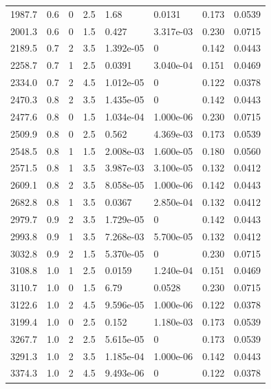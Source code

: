 \documentclass[preview]{standalone}
\begin{document}
{{\begin{tabular}{L{1.2cm}C{1.2cm} C{0.3cm}C{0.5cm} C{1.4cm}C{1.4cm} C{1.4cm}C{1.4cm}}
  1987.7  &   0.6  & 0     & 2.5 &  1.68  & 0.0131  & 0.173 &  0.0539   \\ 
  2001.3  &   0.6  & 0     & 1.5 &  0.427  & 3.317e-03  & 0.230 &  0.0715   \\ 
  2189.5  &   0.7  & 2     & 3.5 &  1.392e-05  & 0  & 0.142 &  0.0443   \\ 
  2258.7  &   0.7  & 1     & 2.5 &  0.0391  & 3.040e-04  & 0.151 &  0.0469   \\ 
  2334.0  &   0.7  & 2     & 4.5 &  1.012e-05  & 0  & 0.122 &  0.0378   \\ 
  2470.3  &   0.8  & 2     & 3.5 &  1.435e-05  & 0  & 0.142 &  0.0443   \\ 
  2477.6  &   0.8  & 0     & 1.5 &  1.034e-04  & 1.000e-06  & 0.230 &  0.0715   \\ 
  2509.9  &   0.8  & 0     & 2.5 &  0.562  & 4.369e-03  & 0.173 &  0.0539   \\ 
  2548.5  &   0.8  & 1     & 1.5 &  2.008e-03  & 1.600e-05  & 0.180 &  0.0560   \\ 
  2571.5  &   0.8  & 1     & 3.5 &  3.987e-03  & 3.100e-05  & 0.132 &  0.0412   \\ 
  2609.1  &   0.8  & 2     & 3.5 &  8.058e-05  & 1.000e-06  & 0.142 &  0.0443   \\ 
  2682.8  &   0.8  & 1     & 3.5 &  0.0367  & 2.850e-04  & 0.132 &  0.0412   \\ 
  2979.7  &   0.9  & 2     & 3.5 &  1.729e-05  & 0  & 0.142 &  0.0443   \\ 
  2993.8  &   0.9  & 1     & 3.5 &  7.268e-03  & 5.700e-05  & 0.132 &  0.0412   \\ 
  3032.8  &   0.9  & 2     & 1.5 &  5.370e-05  & 0  & 0.230 &  0.0715   \\ 
  3108.8  &   1.0  & 1     & 2.5 &  0.0159  & 1.240e-04  & 0.151 &  0.0469   \\ 
  3110.7  &   1.0  & 0     & 1.5 &  6.79  & 0.0528  & 0.230 &  0.0715   \\ 
  3122.6  &   1.0  & 2     & 4.5 &  9.596e-05  & 1.000e-06  & 0.122 &  0.0378   \\ 
  3199.4  &   1.0  & 0     & 2.5 &  0.152  & 1.180e-03  & 0.173 &  0.0539   \\ 
  3267.7  &   1.0  & 2     & 2.5 &  5.615e-05  & 0  & 0.173 &  0.0539   \\ 
  3291.3  &   1.0  & 2     & 3.5 &  1.185e-04  & 1.000e-06  & 0.142 &  0.0443   \\ 
  3374.3  &   1.0  & 2     & 4.5 &  9.493e-06  & 0  & 0.122 &  0.0378   \\ 

\end{tabular}}}
\end{document}
